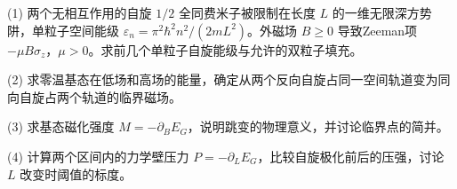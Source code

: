 (1) 两个无相互作用的自旋 \(1/2\) 全同费米子被限制在长度 \(L\) 的一维无限深方势阱，单粒子空间能级 \(\varepsilon_n=\pi^2\hbar^2n^2/(2mL^2)\)。外磁场 \(B\ge0\) 导致Zeeman项 \(-\mu B\sigma_z\)，\(\mu>0\)。求前几个单粒子自旋能级与允许的双粒子填充。

(2) 求零温基态在低场和高场的能量，确定从两个反向自旋占同一空间轨道变为同向自旋占两个轨道的临界磁场。

(3) 求基态磁化强度 \(M=-\partial_BE_G\)，说明跳变的物理意义，并讨论临界点的简并。

(4) 计算两个区间内的力学壁压力 \(P=-\partial_LE_G\)，比较自旋极化前后的压强，讨论 \(L\) 改变时阈值的标度。
